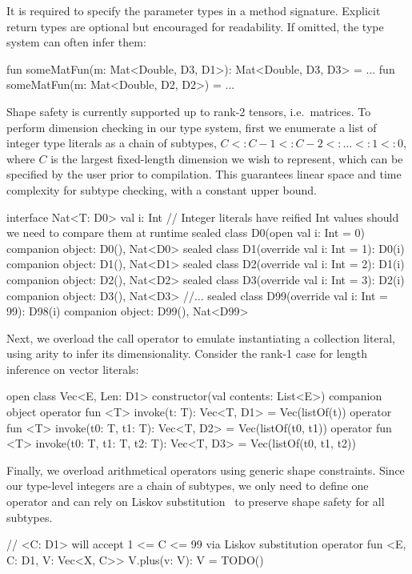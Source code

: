 %
It is required to specify the parameter types in a method signature. Explicit return types are optional but encouraged for readability. If omitted, the type system can often infer them:
%
\begin{kotlinlisting}
fun someMatFun(m: Mat<Double, D3, D1>): Mat<Double, D3, D3> = ...
fun someMatFun(m: Mat<Double, D2, D2>) = ...
\end{kotlinlisting}
%
Shape safety is currently supported up to rank-2 tensors, i.e.\ matrices. To perform dimension checking in our type system, first we enumerate a list of integer type literals as a chain of subtypes, $C <: C - 1 <: C - 2 <: \dots <: 1 <: 0$, where $C$ is the largest fixed-length dimension we wish to represent, which can be specified by the user prior to compilation. This guarantees linear space and time complexity for subtype checking, with a constant upper bound.
%
\begin{kotlinlisting}[caption={Shape safe tensor addition for rank-1 tensors, $\forall C\leq2.$}]
interface Nat<T: D0> { val i: Int }
// Integer literals have reified Int values should we need to compare them at runtime
sealed class D0(open val i: Int = 0) { companion object: D0(), Nat<D0> }
sealed class D1(override val i: Int = 1): D0(i) { companion object: D1(), Nat<D1> }
sealed class D2(override val i: Int = 2): D1(i) { companion object: D2(), Nat<D2> }
sealed class D3(override val i: Int = 3): D2(i) { companion object: D3(), Nat<D3> } //...
sealed class D99(override val i: Int = 99): D98(i) { companion object: D99(), Nat<D99> }
\end{kotlinlisting}
%
Next, we overload the call operator to emulate instantiating a collection literal, using arity to infer its dimensionality. Consider the rank-1 case for length inference on vector literals:
%
\begin{kotlinlisting}
open class Vec<E, Len: D1> constructor(val contents: List<E>) {
    companion object {
        operator fun <T> invoke(t: T): Vec<T, D1> = Vec(listOf(t))
        operator fun <T> invoke(t0: T, t1: T): Vec<T, D2> = Vec(listOf(t0, t1))
        operator fun <T> invoke(t0: T, t1: T, t2: T): Vec<T, D3> = Vec(listOf(t0, t1, t2))
    }
}
\end{kotlinlisting}
%
Finally, we overload arithmetical operators using generic shape constraints. Since our type-level integers are a chain of subtypes, we only need to define one operator and can rely on Liskov substitution~\citep{liskov1987} to preserve shape safety for all subtypes.
%
\begin{kotlinlisting}
// <C: D1> will accept 1 <= C <= 99 via Liskov substitution
operator fun <E, C: D1, V: Vec<X, C>> V.plus(v: V): V = TODO()
\end{kotlinlisting}
